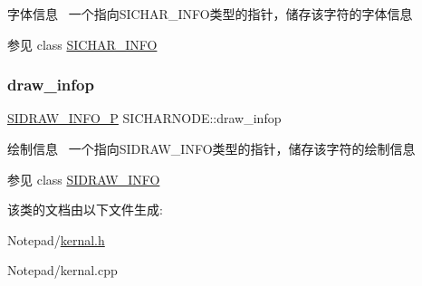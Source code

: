 字体信息~\newline
一个指向\+S\+I\+C\+H\+A\+R\+\_\+\+I\+N\+F\+O类型的指针，储存该字符的字体信息 

\begin{DoxySeeAlso}{参见}
class \hyperlink{class_s_i_c_h_a_r___i_n_f_o}{S\+I\+C\+H\+A\+R\+\_\+\+I\+N\+FO} 
\end{DoxySeeAlso}
\mbox{\label{class_s_i_c_h_a_r_n_o_d_e_aee3adfece6b51d9f71a0aa19d203b106}} 
\subsubsection{\texorpdfstring{draw\+\_\+infop}{draw\_infop}}
{\footnotesize\ttfamily \hyperlink{class_s_i_d_r_a_w___i_n_f_o}{S\+I\+D\+R\+A\+W\+\_\+\+I\+N\+F\+O\+\_\+P} S\+I\+C\+H\+A\+R\+N\+O\+D\+E\+::draw\+\_\+infop}



绘制信息~\newline
一个指向\+S\+I\+D\+R\+A\+W\+\_\+\+I\+N\+F\+O类型的指针，储存该字符的绘制信息 

\begin{DoxySeeAlso}{参见}
class \hyperlink{class_s_i_d_r_a_w___i_n_f_o}{S\+I\+D\+R\+A\+W\+\_\+\+I\+N\+FO} 
\end{DoxySeeAlso}


该类的文档由以下文件生成\+:\begin{DoxyCompactItemize}
\item 
Notepad/\hyperlink{kernal_8h}{kernal.\+h}\item 
Notepad/kernal.\+cpp\end{DoxyCompactItemize}
